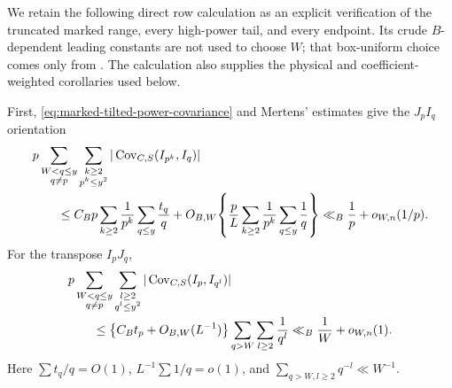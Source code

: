 \documentclass[11pt]{article}
\numberwithin{equation}{section}
\theoremstyle{definition}
\theoremstyle{remark}
\newcommand{\1}{\mathbf 1}
\begin{document}
We retain the following direct row calculation as an explicit verification
of the truncated marked range, every high-power tail, and every endpoint.
Its crude \(B\)-dependent leading constants are not used to choose \(W\);
that box-uniform choice comes only from
.  The calculation also
supplies the physical and coefficient-weighted corollaries used below.

First, \eqref{eq:marked-tilted-power-covariance} and Mertens' estimates
give the \(J_pI_q\) orientation
\begin{align}
 &p\sum_{\substack{W<q\le y\\q\ne p}}
   \sum_{\substack{k\ge2\\p^k\le y^2}}
 |\operatorname{Cov}_{C,S}(I_{p^k},I_q)|\notag\\
 &\qquad\le C_Bp\sum_{k\ge2}\frac1{p^k}
             \sum_{q\le y}\frac{t_q}{q}
 +O_{B,W}\!\left\{\frac pL\sum_{k\ge2}\frac1{p^k}
             \sum_{q\le y}\frac1q\right\}
 \ll_B\frac1p+o_{W,n}(1/p).
 \label{eq:marked-power-row-JI}
\end{align}
For the transpose \(I_pJ_q\),
\begin{align}
 &p\sum_{\substack{W<q\le y\\q\ne p}}
   \sum_{\substack{l\ge2\\q^l\le y^2}}
 |\operatorname{Cov}_{C,S}(I_p,I_{q^l})|\notag\\
 &\qquad\le
 \left\{C_Bt_p+O_{B,W}(L^{-1})\right\}
       \sum_{q>W}\sum_{l\ge2}\frac1{q^l}
 \ll_B\frac1W+o_{W,n}(1).
 \label{eq:marked-power-row-IJ}
\end{align}
Here \(\sum t_q/q=O(1)\), \(L^{-1}\sum1/q=o(1)\), and
\(\sum_{q>W,l\ge2}q^{-l}\ll W^{-1}\).
\end{document}
